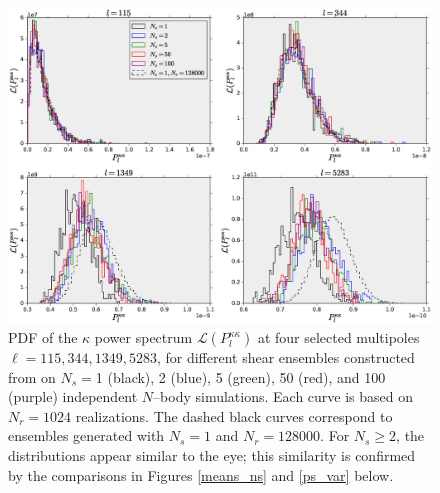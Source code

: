 \documentclass[reprint,aps,prd,superscriptaddress,showkeys,showpacs]{revtex4-1}
\begin{document}

\begin{figure}
\includegraphics[scale=0.4]{Figures/ps_pdf.eps}
\caption{PDF of the $\kappa$ power spectrum
  $\mathcal{L}(P_l^{\kappa\kappa})$ at four selected multipoles
  $\ell=115,344,1349,5283$, for different shear ensembles constructed
  from on $N_s=$1 (black), 2 (blue), 5 (green), 50 (red), and 100
  (purple) independent $N$--body simulations. Each curve is based on
  $N_r=1024$ realizations.  The dashed black curves correspond to
  ensembles generated with $N_s=1$ and $N_r=128000$. For $N_s\geq2$,
  the distributions appear similar to the eye; this similarity is
  confirmed by the comparisons in Figures \ref{means_ns} and
  \ref{ps_var} below.}
\label{ps_pdf}
\end{figure}
\end{document}
